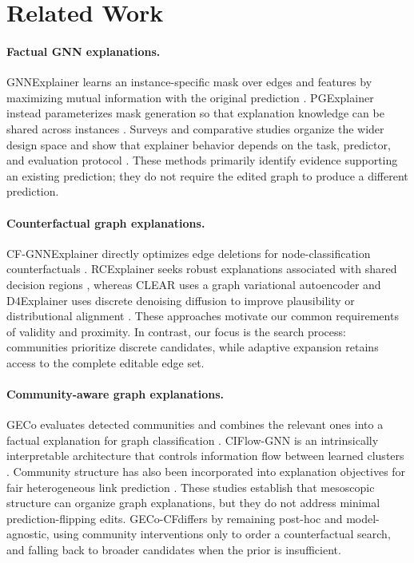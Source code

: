 \documentclass[runningheads]{llncs}
\newcommand{\method}{GECo-CF}
\begin{document}
\section{Related Work}
\label{sec:related-work}

\paragraph{Factual GNN explanations.}
GNNExplainer learns an instance-specific mask over edges and features by
maximizing mutual information with the original prediction
\cite{ying2019gnnexplainer}. PGExplainer instead parameterizes mask generation
so that explanation knowledge can be shared across instances
\cite{luo2020pgexplainer}. Surveys and comparative studies organize the wider
design space and show that explainer behavior depends on the task, predictor,
and evaluation protocol \cite{yuan2022survey,longa2025explaining}. These methods
primarily identify evidence supporting an existing prediction; they do not
require the edited graph to produce a different prediction.

\paragraph{Counterfactual graph explanations.}
CF-GNNExplainer directly optimizes edge deletions for node-classification
counterfactuals \cite{lucic2022cfgnn}. RCExplainer seeks robust explanations
associated with shared decision regions \cite{bajaj2021rcexplainer}, whereas
CLEAR uses a graph variational autoencoder and D4Explainer uses discrete
denoising diffusion to improve plausibility or distributional alignment
\cite{ma2022clear,huang2023d4explainer}. These approaches motivate our common
requirements of validity and proximity. In contrast, our focus is the search
process: communities prioritize discrete candidates, while adaptive expansion
retains access to the complete editable edge set.

\paragraph{Community-aware graph explanations.}
GECo evaluates detected communities and combines the relevant ones into a
factual explanation for graph classification \cite{amato2026geco}. CIFlow-GNN
is an intrinsically interpretable architecture that controls information flow
between learned clusters \cite{yang2026ciflow}. Community structure has also
been incorporated into explanation objectives for fair heterogeneous link
prediction \cite{wen2025fexpcom}. These studies establish that mesoscopic
structure can organize graph explanations, but they do not address minimal
prediction-flipping edits. \method differs by remaining post-hoc and
model-agnostic, using community interventions only to order a counterfactual
search, and falling back to broader candidates when the prior is insufficient.
\end{document}
